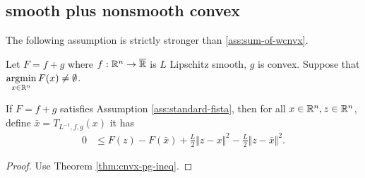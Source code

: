 \documentclass[12pt]{report}
\begin{document}
        \subsection{smooth plus nonsmooth convex}
            The following assumption is strictly stronger than \ref{ass:sum-of-wcnvx}. 
            \begin{assumption}\label{ass:standard-fista}
                Let $F = f + g$ where $f:\mathbb R^n\rightarrow \overline {\mathbb R}$ is $L$ Lipschitz smooth, $g$ is convex. 
                Suppose that $\mathop{\rm argmin}\limits_{x \in \mathbb R^n} F(x)\neq \emptyset$. 
            \end{assumption}
            \begin{lemma}
                If $F = f + g$ satisfies Assumption \ref{ass:standard-fista}, then for all $x \in \mathbb R^n, z \in \mathbb R^n$, define $\bar x = T_{L^{-1}, f, g}(x)$ it has 
                \begin{align*}
                    0 &\le F(z) - F(\bar x) + \frac{L}{2}\Vert z - x\Vert^2 - \frac{L}{2}\Vert z - \bar x\Vert^2. 
                \end{align*}
            \end{lemma}
            \begin{proof}
                Use Theorem \ref{thm:cnvx-pg-ineq}. 
            \end{proof}
            
\end{document}
